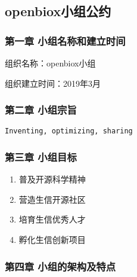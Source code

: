 \documentclass[]{article}
\title{}
\author{}
\date{}
\providecommand{\tightlist}{%
  \setlength{\itemsep}{0pt}\setlength{\parskip}{0pt}}
\begin{document}
\subsection{openbiox小组公约}\label{openbiox}

\subsubsection{第一章 小组名称和建立时间}\label{-}

组织名称：openbiox小组

组织建立时间：2019年3月

\subsubsection{第二章 小组宗旨}\label{-}

\texttt{Inventing,\ optimizing,\ sharing}

\subsubsection{第三章 小组目标}\label{-}

\begin{enumerate}
\def\labelenumi{\arabic{enumi}.}
\tightlist
\item
  普及开源科学精神
\item
  营造生信开源社区
\item
  培育生信优秀人才
\item
  孵化生信创新项目
\end{enumerate}

\subsubsection{第四章 小组的架构及特点}\label{-}
\end{document}
